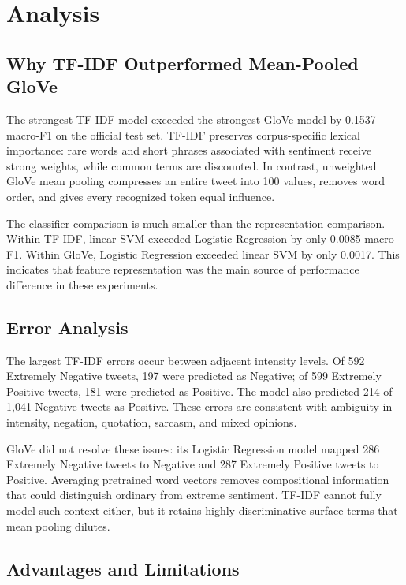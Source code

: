 \section{Analysis}
\label{sec:analysis}

\subsection{Why TF-IDF Outperformed Mean-Pooled GloVe}

The strongest TF-IDF model exceeded the strongest GloVe model by 0.1537 macro-F1 on the 
official test set. TF-IDF preserves corpus-specific lexical importance: rare words and short 
phrases associated with sentiment receive strong weights, while common terms are discounted. 
In contrast, unweighted GloVe mean pooling compresses an entire tweet into 100 values, removes 
word order, and gives every recognized token equal influence.

The classifier comparison is much smaller than the representation comparison. 
Within TF-IDF, linear SVM exceeded Logistic Regression by only 0.0085 macro-F1. 
Within GloVe, Logistic Regression exceeded linear SVM by only 0.0017. This indicates 
that feature representation was the main source of performance difference in these experiments.

\subsection{Error Analysis}

The largest TF-IDF errors occur between adjacent intensity levels. 
Of 592 Extremely Negative tweets, 197 were predicted as Negative; of 599 Extremely 
Positive tweets, 181 were predicted as Positive. The model also predicted 214 of 1,041 Negative 
tweets as Positive. These errors are consistent with ambiguity in intensity, negation, quotation, 
sarcasm, and mixed opinions.

GloVe did not resolve these issues: its Logistic Regression model mapped 286 Extremely 
Negative tweets to Negative and 287 Extremely Positive tweets to Positive. Averaging pretrained 
word vectors removes compositional information that could distinguish ordinary from extreme 
sentiment. TF-IDF cannot fully model such context either, but it retains highly discriminative 
surface terms that mean pooling dilutes.

\subsection{Advantages and Limitations}

